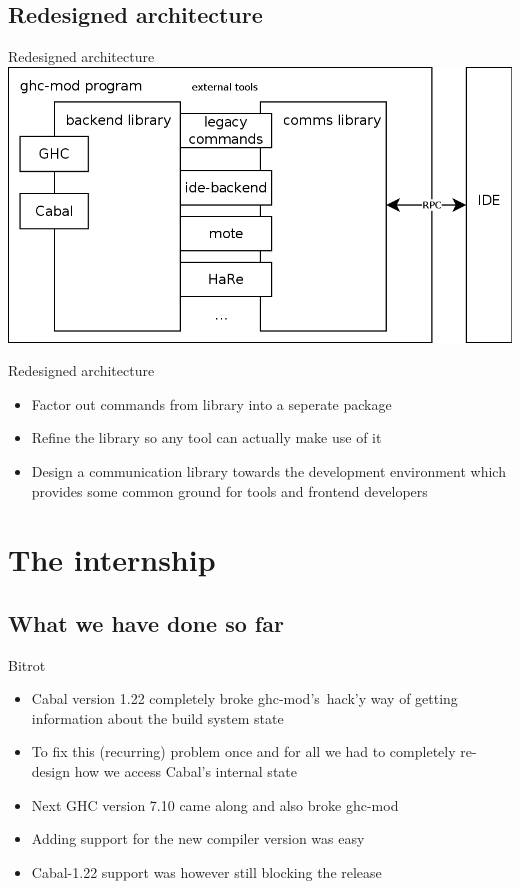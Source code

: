 \documentclass{beamer}
\newcommand\gm{{\Rokkitt ghc-mod}\ }
\newcommand\gms{{\Rokkitt ghc-mod's}\ }
\begin{document}
\subsection{Redesigned architecture}
\begin{frame}{Redesigned architecture}
  \includegraphics[width=\textwidth]{planned-architecture}
\end{frame}

\begin{frame}{Redesigned architecture}
  \begin{itemize}
  \item Factor out commands from library into a seperate package
  \item Refine the library so any tool can actually make use of it
  \item Design a communication library towards the development environment which
    provides some common ground for tools and frontend developers
  \end{itemize}
\end{frame}

\section{The internship}

\subsection{What we have done so far}

\begin{frame}{Bitrot}
  \begin{itemize}
  \item Cabal version 1.22 completely broke \gms hack'y way of getting
    information about the build system state
  \item To fix this (recurring) problem once and for all we had to completely
    re-design how we access Cabal's internal state
  \item Next GHC version 7.10 came along and also broke \gm
  \item Adding support for the new compiler version was easy
  \item Cabal-1.22 support was however still blocking the release
  \end{itemize}
\end{frame}
\end{document}
